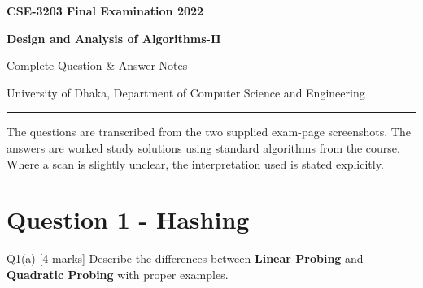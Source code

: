 \documentclass[10.5pt,a4paper]{article}
\begin{document}
\begin{center}
{\LARGE\bfseries\color{primary} CSE-3203 Final Examination 2022}\par
\vspace{2mm}
{\Large\bfseries Design and Analysis of Algorithms-II}\par
\vspace{1mm}
{\large Complete Question \& Answer Notes}\par
\vspace{2mm}
{\small University of Dhaka, Department of Computer Science and Engineering}\par
\vspace{3mm}
\rule{0.9\textwidth}{0.6pt}
\end{center}

\begin{examtip}
The questions are transcribed from the two supplied exam-page screenshots. The answers are worked study solutions using standard algorithms from the course. Where a scan is slightly unclear, the interpretation used is stated explicitly.
\end{examtip}

\tableofcontents
\newpage

\section{Question 1 - Hashing}

\begin{questionbox}{Q1(a) [4 marks]}
Describe the differences between \textbf{Linear Probing} and \textbf{Quadratic Probing} with proper examples.
\end{questionbox}
\end{document}
